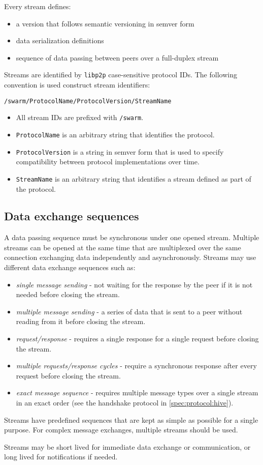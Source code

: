 Every stream defines:

\begin{itemize}
\item a version that follows semantic versioning in semver form
\item data serialization definitions
\item sequence of data passing between peers over a full-duplex stream
\end{itemize}

Streams are identified by \texttt{libp2p} case-sensitive protocol IDs. The following convention is used construct stream identifiers:

\begin{lstlisting}[basicstyle=\ttfamily]
/swarm/ProtocolName/ProtocolVersion/StreamName
\end{lstlisting}

\begin{itemize}
\item All stream IDs are prefixed with \texttt{/swarm}.
\item \texttt{ProtocolName} is an arbitrary string that identifies the protocol.
\item \texttt{ProtocolVersion} is a string in semver form that is used to specify compatibility between protocol implementations over time.
\item \texttt{StreamName} is an arbitrary string that identifies a stream defined as part of the protocol.
\end{itemize}

\subsection{Data exchange sequences}

A data passing sequence must be synchronous under one opened stream. Multiple streams can be opened at the same time that are multiplexed over the same connection exchanging data independently and asynchronously. Streams may use different data exchange sequences such as:

\begin{itemize}
\item \emph{single message sending} - not waiting for the response by the peer if it is not needed before closing the stream.
\item \emph{multiple message sending} - a series of data that is sent to a peer without reading from it before closing the stream.
\item \emph{request/response} - requires a single response for a single request before closing the stream.
\item \emph{multiple requests/response cycles} - require a synchronous response after every request before closing the stream.
\item \emph{exact message sequence} -  requires multiple message types over a single stream in an exact order (see the handshake protocol in \ref{spec:protocol:hive}).
\end{itemize}

Streams have predefined sequences that are kept as simple as possible for a single purpose. For complex message exchanges, multiple streams should be used.

Streams may be short lived for immediate data exchange or communication, or long lived for notifications if needed.
